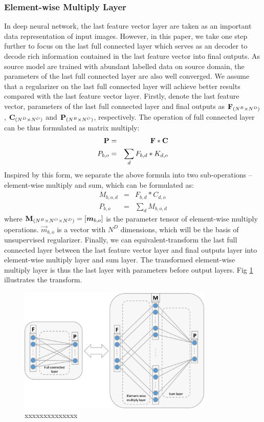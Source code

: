 \documentclass[runningheads]{llncs}
\begin{document}
\subsubsection{Element-wise Multiply Layer}
\label{section:Element-wise Multiply Layer}
In deep neural network, the last feature vector layer are taken as an important data representation of input images. However, in this paper, we take one step further to focus on the last full connected layer which serves as an decoder to decode rich information contained in the last feature vector into final outputs. As source model are trained with abundant labelled data on source domain, the parameters of the last full connected layer are also well converged. We assume that a regularizer on the last full connected layer will achieve better results compared with the last feature vector layer. Firstly, denote the last feature vector, parameters of the last full connected layer and final outputs as ${\bf F}_{(N^{B}\times N^{D})}$, ${\bf C}_{(N^{D}\times N^{O})}$ and ${\bf P}_{(N^{B}\times N^{O})}$, respectively. The operation of full connected layer can be thus formulated as matrix multiply:
\begin{eqnarray}
  {\bf P} &=& {\bf F}*{\bf C} \\
  P_{b,o} &=&  \sum_{d}{F_{b,d}*K_{d,o}}
\end{eqnarray}
Inspired by this form, we separate the above formula into two sub-operations -- element-wise multiply and sum, which can be formulated as:
\begin{eqnarray}
  M_{b,o,d} &=& F_{b,d} * C_{d,o} \\
  P_{b,o} &=& \sum_{d}{M_{b,o,d}}
\end{eqnarray}
where ${\bf M}_{(N^{B}\times N^{O}\times N^{D})} = [\vec{m}_{b,o}]$ is the parameter tensor of element-wise multiply operations. $\vec{m}_{b,o}$ is a vector with $N^{D}$ dimensions, which will be the basis of unsupervised regularizer. Finally, we can equivalent-transform the last full connected layer between the last feature vector layer and final outputs layer into element-wise multiply layer and sum layer. The transformed element-wise multiply layer is thus the last layer with parameters before output layers. Fig \ref{fig:elementwiselayer} illustrates the transform.

\begin{figure}
\centering
\includegraphics[height=6cm]{images/elementwiselayer.png}
\caption{xxxxxxxxxxxxxx}
\label{fig:elementwiselayer}
\end{figure}
\end{document}
